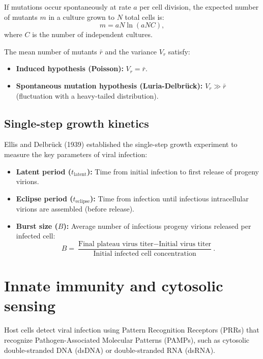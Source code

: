\documentclass[12pt, a4paper, oneside]{report}
\begin{document}
If mutations occur spontaneously at rate $a$ per cell division, the expected number of mutants $m$ in a culture grown to $N$ total cells is:
\begin{equation}
  m = a N \ln(a N C),
  \label{eq:luria_delbruck}
\end{equation}
where $C$ is the number of independent cultures.

The mean number of mutants $\bar{r}$ and the variance $V_r$ satisfy:
\begin{itemize}
  \item \textbf{Induced hypothesis (Poisson):} $V_r = \bar{r}$.
  \item \textbf{Spontaneous mutation hypothesis (Luria-Delbrück):} $V_r \gg \bar{r}$ (fluctuation with a heavy-tailed distribution).
\end{itemize}

\subsection{Single-step growth kinetics}

Ellis and Delbrück (1939) established the single-step growth experiment to measure the key parameters of viral infection:
\begin{itemize}
  \item \textbf{Latent period ($t_{\text{latent}}$):} Time from initial infection to first release of progeny virions.
  \item \textbf{Eclipse period ($t_{\text{eclipse}}$):} Time from infection until infectious intracellular virions are assembled (before release).
  \item \textbf{Burst size ($B$):} Average number of infectious progeny virions released per infected cell:
        \begin{equation}
          B = \frac{\text{Final plateau virus titer} - \text{Initial virus titer}}{\text{Initial infected cell concentration}}.
          \label{eq:burst_size}
        \end{equation}
\end{itemize}

\section{Innate immunity and cytosolic sensing}

Host cells detect viral infection using Pattern Recognition Receptors (PRRs) that recognize Pathogen-Associated Molecular Patterns (PAMPs), such as cytosolic double-stranded DNA (dsDNA) or double-stranded RNA (dsRNA).
\end{document}
